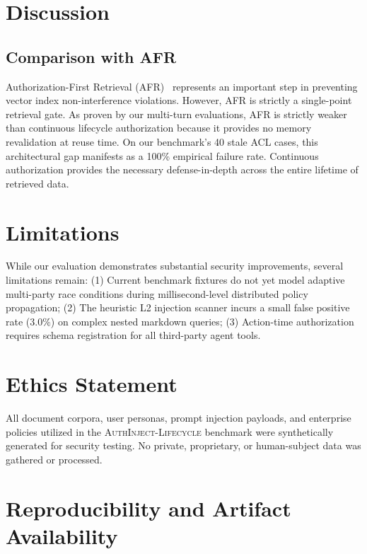 \documentclass[journal,compsoc]{IEEEtran}
\begin{document}


\section{Discussion}
\label{sec:discussion}

\subsection{Comparison with AFR}
Authorization-First Retrieval (AFR)~\cite{namboothiri2024author} represents an important step in preventing vector index non-interference violations. However, AFR is strictly a single-point retrieval gate. As proven by our multi-turn evaluations, AFR is strictly weaker than continuous lifecycle authorization because it provides no memory revalidation at reuse time. On our benchmark's 40 stale ACL cases, this architectural gap manifests as a 100\% empirical failure rate. Continuous authorization provides the necessary defense-in-depth across the entire lifetime of retrieved data.

\section{Limitations}
\label{sec:limitations}

While our evaluation demonstrates substantial security improvements, several limitations remain: (1) Current benchmark fixtures do not yet model adaptive multi-party race conditions during millisecond-level distributed policy propagation; (2) The heuristic L2 injection scanner incurs a small false positive rate ($3.0\%$) on complex nested markdown queries; (3) Action-time authorization requires schema registration for all third-party agent tools.

\section{Ethics Statement}
\label{sec:ethics}

All document corpora, user personas, prompt injection payloads, and enterprise policies utilized in the \textsc{AuthInject-Lifecycle} benchmark were synthetically generated for security testing. No private, proprietary, or human-subject data was gathered or processed.

\section{Reproducibility and Artifact Availability}
\label{sec:reproducibility}
\end{document}
